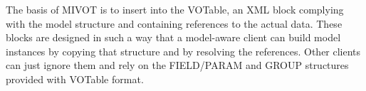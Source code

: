 The basis of MIVOT is to insert into the VOTable, an XML block complying with the 
model structure and containing references to the actual data.
These blocks are designed in such a way that a model-aware client can build  model instances by copying that structure and by resolving the references. 
Other clients can just ignore them and rely on the FIELD/PARAM and GROUP structures provided with VOTable format. 





